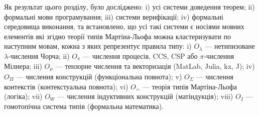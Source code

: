 Як результат цього розділу, було досліджено:
i) усі системи доведення теорем;
ii) формальні мови програмування;
iii) системи верифікації;
iv) формальні середовища виконання,
    та встановлено, що усі такі системи є носіями
    мовних елементів які згідно теорії типів Мартіна-Льофа можна
    кластеризувати по наступним мовам, кожна з яких репрезентує правила типу:
i) $O_\lambda$ --- нетипизоване $\lambda$-числення Чорча;
ii) $O_\pi$ --- числення процесів, CCS, CSP або $\pi$-числення Мілнера;
iii) $O_\mu$ --- тензорне числення та векторизація (MatLab, Julia, kx, J);
iv) $O_\Pi$ --- числення конструкцій (функціональна повнота);
v) $O_\Sigma$ --- числення контекстів (контекстуальна повнота);
vi) $O_=$ --- теорія типів Мартіна-Льофа (логіка);
vii) $O_W$ --- числення індуктивних конструкцій (матіндукція);
viii) $O_I$ --- гомотопічна система типів (формальна математика).
